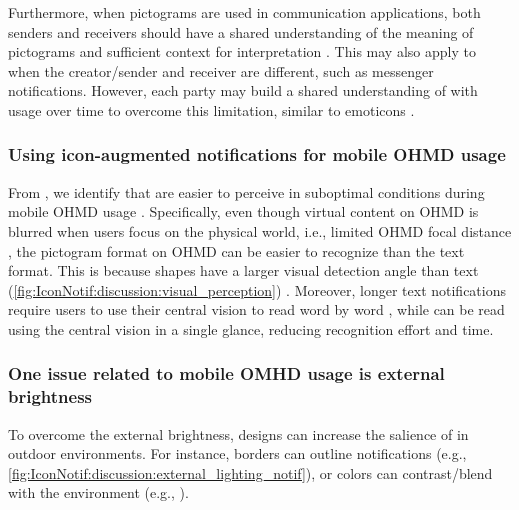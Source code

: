 Furthermore, when pictograms are used in communication applications, both senders and receivers should have a shared  understanding of the meaning of pictograms and sufficient context for interpretation \cite{cho_assisting_2008}. This may also apply to  when the creator/sender and receiver are different, such as messenger notifications. However, each party may build a shared understanding of  with usage over time to overcome this limitation, similar to emoticons \cite{zhou_goodbye_2017}.

\subsubsection*{Using icon-augmented notifications for mobile OHMD usage}
\label{sec:IconNotif:discussion:reason_pictograms}

From \studyfour{}, we identify that  are easier to perceive in suboptimal conditions during mobile OHMD usage \cite[Ch~6]{ells_rapid_1979, wickens_engineering_2015}. Specifically, even though virtual content on OHMD is blurred when users focus on the physical world, i.e., limited OHMD focal distance \cite{ishiguro_peripheral_2011, itoh_towards_2021}, the pictogram format on OHMD can be easier to recognize than the text format. This is because shapes have a larger visual detection angle than text (\autoref{fig:IconNotif:discussion:visual_perception}) \cite{ishiguro_peripheral_2011, yeh_target_1999}. Moreover, longer text notifications require users to use their central vision to read word by word \cite[Ch~6]{wickens_engineering_2015}, while  can be read using the central vision in a single glance, reducing recognition effort and time.



\subsubsection*{One issue related to mobile OMHD usage is  external brightness}

To overcome the external brightness, designs can increase the salience of  in outdoor environments. For instance, borders can outline notifications (e.g., \autoref{fig:IconNotif:discussion:external_lighting_notif}), or colors can contrast/blend with the environment (e.g., \cite{ang_study_2020, david_hincapie_ramos_smartcolor_2014}).


